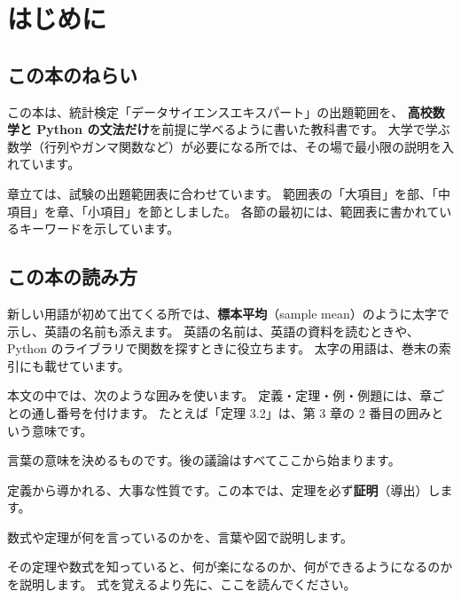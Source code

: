 \chapter{はじめに}

\section*{この本のねらい}

この本は、統計検定「データサイエンスエキスパート」の出題範囲を、
\textbf{高校数学と Python の文法だけ}を前提に学べるように書いた教科書です。
大学で学ぶ数学（行列やガンマ関数など）が必要になる所では、その場で最小限の説明を入れています。

章立ては、試験の出題範囲表に合わせています。
範囲表の「大項目」を部、「中項目」を章、「小項目」を節としました。
各節の最初には、範囲表に書かれているキーワードを示しています。

\section*{この本の読み方}

新しい用語が初めて出てくる所では、{\sffamily\gtfamily\bfseries 標本平均}（sample mean）のように太字で示し、英語の名前も添えます。
英語の名前は、英語の資料を読むときや、Python のライブラリで関数を探すときに役立ちます。
太字の用語は、巻末の索引にも載せています。

本文の中では、次のような囲みを使います。
定義・定理・例・例題には、章ごとの通し番号を付けます。
たとえば「定理 3.2」は、第 3 章の 2 番目の囲みという意味です。

\begingroup
\renewcommand{\thechapter}{3}  %

\begin{definition}
  言葉の意味を決めるものです。後の議論はすべてここから始まります。
\end{definition}

\begin{theorem}
  定義から導かれる、大事な性質です。この本では、定理を必ず\textbf{証明}（導出）します。
\end{theorem}

\begin{intuition}
  数式や定理が何を言っているのかを、言葉や図で説明します。
\end{intuition}

\begin{merit}
  その定理や数式を知っていると、何が楽になるのか、何ができるようになるのかを説明します。
  式を覚えるより先に、ここを読んでください。
\end{merit}

